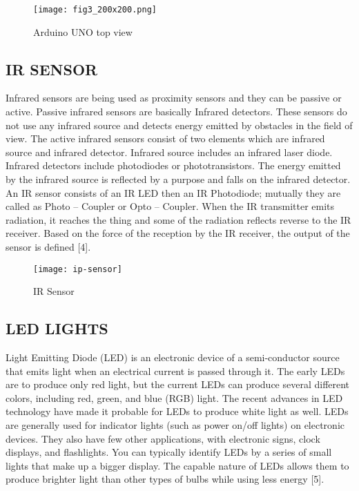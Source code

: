 \documentclass[conference]{IEEEtran}
\begin{document}
    \begin{figure}[htbp]
        \centerline{\texttt{[image: fig3\_200x200.png]}}
        \caption{Arduino UNO top view}
        \label{fig}
    \end{figure}

    \subsection{IR SENSOR}
    Infrared sensors are being used as proximity sensors and
    they can be passive or active. Passive infrared sensors are
    basically Infrared detectors. These sensors do not use any
    infrared source and detects energy emitted by obstacles in
    the field of view. The active infrared sensors consist of two
    elements which are infrared source and infrared detector.
    Infrared source includes an infrared laser diode. Infrared
    detectors include photodiodes or phototransistors. The
    energy emitted by the infrared source is reflected by a
    purpose and falls on the infrared detector. An IR sensor
    consists of an IR LED then an IR Photodiode; mutually they
    are called as Photo – Coupler or Opto – Coupler. When the IR
    transmitter emits radiation, it reaches the thing and some of
    the radiation reflects reverse to the IR receiver. Based on the
    force of the reception by the IR receiver, the output of the
    sensor is defined [4].

    \begin{figure}[htbp]
        \centerline{\texttt{[image: ip-sensor]}}
        \caption{IR Sensor}
        \label{fig}
    \end{figure}


    \subsection{LED LIGHTS}
    \paragraphA Light Emitting Diode (LED) is an electronic device of a
    semi-conductor source that emits light when an electrical
    current is passed through it. The early LEDs are to produce
    only red light, but the current LEDs can produce several
    different colors, including red, green, and blue (RGB) light.
    The recent advances in LED technology have made it
    probable for LEDs to produce white light as well. LEDs are
    generally used for indicator lights (such as power on/off
    lights) on electronic devices. They also have few other
    applications, with electronic signs, clock displays, and
    flashlights. You can typically identify LEDs by a series of small lights that make up a bigger display. The capable
    nature of LEDs allows them to produce brighter light than
    other types of bulbs while using less energy [5].
\end{document}
